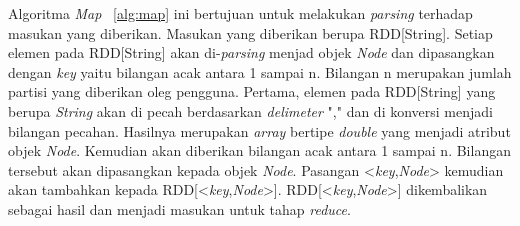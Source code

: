 \begin{algorithm}[H]
	\label{alg:patern}
	\DontPrintSemicolon\SetAlgoNoLine\LinesNumbered
	
\end{algorithm}
 
Algoritma \textit{Map} ~\ref{alg:map} ini bertujuan untuk melakukan \textit{parsing} terhadap masukan yang diberikan. Masukan yang diberikan berupa RDD[String]. Setiap elemen pada RDD[String] akan di-\textit{parsing} menjad objek \textit{Node} dan dipasangkan dengan \textit{key} yaitu bilangan acak antara 1 sampai n. Bilangan n merupakan jumlah partisi yang diberikan oleg pengguna. Pertama, elemen pada RDD[String] yang berupa \textit{String} akan di pecah berdasarkan \textit{delimeter} "," dan di konversi menjadi bilangan pecahan. Hasilnya merupakan \textit{array} bertipe \textit{double} yang menjadi atribut objek \textit{Node}. Kemudian akan diberikan bilangan acak antara 1 sampai n. Bilangan tersebut akan dipasangkan kepada objek \textit{Node}. Pasangan <\textit{key},\textit{Node}> kemudian akan tambahkan kepada RDD[<\textit{key},\textit{Node}>]. RDD[<\textit{key},\textit{Node}>] dikembalikan sebagai hasil dan menjadi masukan untuk tahap \textit{reduce}.\\

